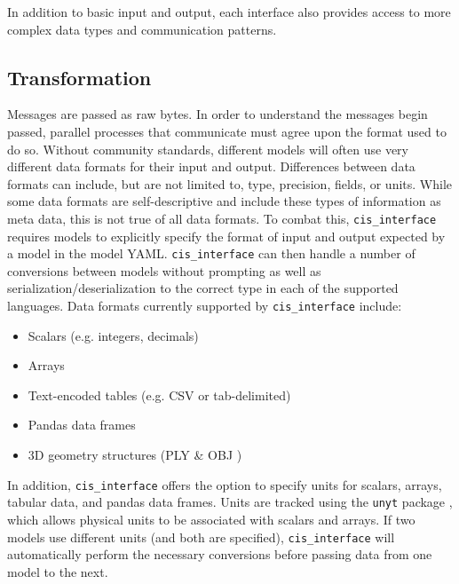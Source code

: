 \documentclass[journal]{IEEEtran}
\newcommand{\cis}{{\tt cis\_interface}{}}
\begin{document}
In addition to basic input and output, each interface also provides access 
to more complex data types and communication patterns.


%
\subsection{Transformation}\label{SS:transformation}
%
%
Messages are passed as raw bytes. In order to understand the messages begin passed, parallel processes that communicate must agree upon the format used to do so. Without community standards, different models will often use very different data formats for their input and output. Differences between data formats can include, but are not limited to, type, precision, fields, or units. While some data formats are self-descriptive and include these types of information as meta data, this is not true of all data formats. To combat this, {\cis} requires models to explicitly specify the format of input and output expected by a model in the model YAML. {\cis} can then handle a number of conversions between models without prompting as well as serialization/deserialization to the correct type in each of the supported languages. Data formats currently supported by {\cis} include:
%
\begin{itemize}
	\item Scalars (e.g. integers, decimals)
	\item Arrays
	\item Text-encoded tables (e.g. CSV or tab-delimited)
	\item Pandas data frames \citep{pandas}
	\item 3D geometry structures (PLY \citep{ply} \& OBJ \citep{obj})
\end{itemize}

%
In addition, {\cis} offers the option to specify units for scalars, arrays, tabular data, and pandas data frames. Units are tracked using the {\tt unyt} package \citep{Goldbaum2018}, which allows physical units to be associated with scalars and arrays. If two models use different units (and both are specified), {\cis} will automatically perform the necessary conversions before passing data from one model to the next.
\end{document}
